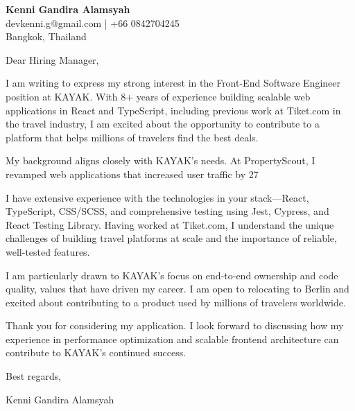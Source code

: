 \documentclass[11pt,a4paper]{letter}
\begin{document}
\begin{flushleft}
\textbf{Kenni Gandira Alamsyah} \\
devkenni.g@gmail.com | +66 0842704245 \\
Bangkok, Thailand
\end{flushleft}

\vspace{1em}

Dear Hiring Manager,

I am writing to express my strong interest in the Front-End Software Engineer position at KAYAK. With 8+ years of experience building scalable web applications in React and TypeScript, including previous work at Tiket.com in the travel industry, I am excited about the opportunity to contribute to a platform that helps millions of travelers find the best deals.

My background aligns closely with KAYAK's needs. At PropertyScout, I revamped web applications that increased user traffic by 27%

I have extensive experience with the technologies in your stack—React, TypeScript, CSS/SCSS, and comprehensive testing using Jest, Cypress, and React Testing Library. Having worked at Tiket.com, I understand the unique challenges of building travel platforms at scale and the importance of reliable, well-tested features.

I am particularly drawn to KAYAK's focus on end-to-end ownership and code quality, values that have driven my career. I am open to relocating to Berlin and excited about contributing to a product used by millions of travelers worldwide.

Thank you for considering my application. I look forward to discussing how my experience in performance optimization and scalable frontend architecture can contribute to KAYAK's continued success.

\vspace{1em}

Best regards,

Kenni Gandira Alamsyah
\end{document}
